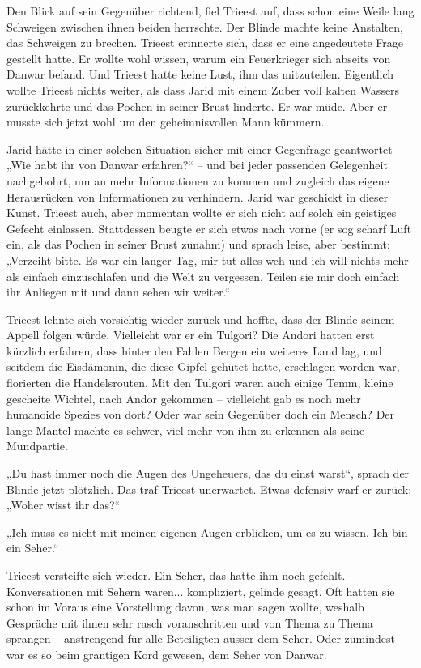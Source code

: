 \documentclass[10pt, a4paper, oneside]{book}
\begin{document}
Den Blick auf sein Gegenüber richtend, fiel Trieest auf, dass schon eine Weile lang Schweigen zwischen ihnen beiden herrschte. Der Blinde machte keine Anstalten, das Schweigen zu brechen. Trieest erinnerte sich, dass er eine angedeutete Frage gestellt hatte. Er wollte wohl wissen, warum ein Feuerkrieger sich abseits von Danwar befand. Und Trieest hatte keine Lust, ihm das mitzuteilen. Eigentlich wollte Trieest nichts weiter, als dass Jarid mit einem Zuber voll kalten Wassers zurückkehrte und das Pochen in seiner Brust linderte. Er war müde. Aber er musste sich jetzt wohl um den geheimnisvollen Mann kümmern.

Jarid hätte in einer solchen Situation sicher mit einer Gegenfrage geantwortet – „Wie habt ihr von Danwar erfahren?“ – und bei jeder passenden Gelegenheit nachgebohrt, um an mehr Informationen zu kommen und zugleich das eigene Herausrücken von Informationen zu verhindern. Jarid war geschickt in dieser Kunst. Trieest auch, aber momentan wollte er sich nicht auf solch ein geistiges Gefecht einlassen. Stattdessen beugte er sich etwas nach vorne (er sog scharf Luft ein, als das Pochen in seiner Brust zunahm) und sprach leise, aber bestimmt: „Verzeiht bitte. Es war ein langer Tag, mir tut alles weh und ich will nichts mehr als einfach einzuschlafen und die Welt zu vergessen. Teilen sie mir doch einfach ihr Anliegen mit und dann sehen wir weiter.“

Trieest lehnte sich vorsichtig wieder zurück und hoffte, dass der Blinde seinem Appell folgen würde. Vielleicht war er ein Tulgori? Die Andori hatten erst kürzlich erfahren, dass hinter den Fahlen Bergen ein weiteres Land lag, und seitdem die Eisdämonin, die diese Gipfel gehütet hatte, erschlagen worden war, florierten die Handelsrouten. Mit den Tulgori waren auch einige Temm, kleine gescheite Wichtel, nach Andor gekommen – vielleicht gab es noch mehr humanoide Spezies von dort? Oder war sein Gegenüber doch ein Mensch? Der lange Mantel machte es schwer, viel mehr von ihm zu erkennen als seine Mundpartie.\bigskip



„Du hast immer noch die Augen des Ungeheuers, das du einst warst“, sprach der Blinde jetzt plötzlich. Das traf Trieest unerwartet. Etwas defensiv warf er zurück: „Woher wisst ihr das?“

„Ich muss es nicht mit meinen eigenen Augen erblicken, um es zu wissen. Ich bin ein Seher.“

Trieest versteifte sich wieder. Ein Seher, das hatte ihm noch gefehlt. Konversationen mit Sehern waren... kompliziert, gelinde gesagt. Oft hatten sie schon im Voraus eine Vorstellung davon, was man sagen wollte, weshalb Gespräche mit ihnen sehr rasch voranschritten und von Thema zu Thema sprangen – anstrengend für alle Beteiligten ausser dem Seher. Oder zumindest war es so beim grantigen Kord gewesen, dem Seher von Danwar.
\end{document}
